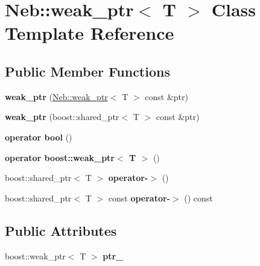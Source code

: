 \hypertarget{classNeb_1_1weak__ptr}{\section{\-Neb\-:\-:weak\-\_\-ptr$<$ \-T $>$ \-Class \-Template \-Reference}
\label{classNeb_1_1weak__ptr}
}
\subsection*{\-Public \-Member \-Functions}
\begin{DoxyCompactItemize}
\item 
\hypertarget{classNeb_1_1weak__ptr_a831fec6c1355a9d91e834099c0dc6227}{{\bfseries weak\-\_\-ptr} (\hyperlink{classNeb_1_1weak__ptr}{\-Neb\-::weak\-\_\-ptr}$<$ \-T $>$ const \&ptr)}\label{classNeb_1_1weak__ptr_a831fec6c1355a9d91e834099c0dc6227}

\item 
\hypertarget{classNeb_1_1weak__ptr_ad29ba574546701e7ed8a0b452dcd76a6}{{\bfseries weak\-\_\-ptr} (boost\-::shared\-\_\-ptr$<$ \-T $>$ const \&ptr)}\label{classNeb_1_1weak__ptr_ad29ba574546701e7ed8a0b452dcd76a6}

\item 
\hypertarget{classNeb_1_1weak__ptr_a04c92f7e5ec8e3e83d2abce8365b8feb}{{\bfseries operator bool} ()}\label{classNeb_1_1weak__ptr_a04c92f7e5ec8e3e83d2abce8365b8feb}

\item 
\hypertarget{classNeb_1_1weak__ptr_ab67828010c104deb340eb460148b651d}{{\bfseries operator boost\-::weak\-\_\-ptr$<$ T $>$} ()}\label{classNeb_1_1weak__ptr_ab67828010c104deb340eb460148b651d}

\item 
\hypertarget{classNeb_1_1weak__ptr_afb380fd10451d5f26809091e54cde62f}{boost\-::shared\-\_\-ptr$<$ \-T $>$ {\bfseries operator-\/$>$} ()}\label{classNeb_1_1weak__ptr_afb380fd10451d5f26809091e54cde62f}

\item 
\hypertarget{classNeb_1_1weak__ptr_af950ca38e1c55c8b428d6969cebcc189}{boost\-::shared\-\_\-ptr$<$ \-T $>$ const {\bfseries operator-\/$>$} () const }\label{classNeb_1_1weak__ptr_af950ca38e1c55c8b428d6969cebcc189}

\end{DoxyCompactItemize}
\subsection*{\-Public \-Attributes}
\begin{DoxyCompactItemize}
\item 
\hypertarget{classNeb_1_1weak__ptr_a9ffc8d0fd4564e9e82d6827570768603}{boost\-::weak\-\_\-ptr$<$ \-T $>$ {\bfseries ptr\-\_\-}}\label{classNeb_1_1weak__ptr_a9ffc8d0fd4564e9e82d6827570768603}

\end{DoxyCompactItemize}
